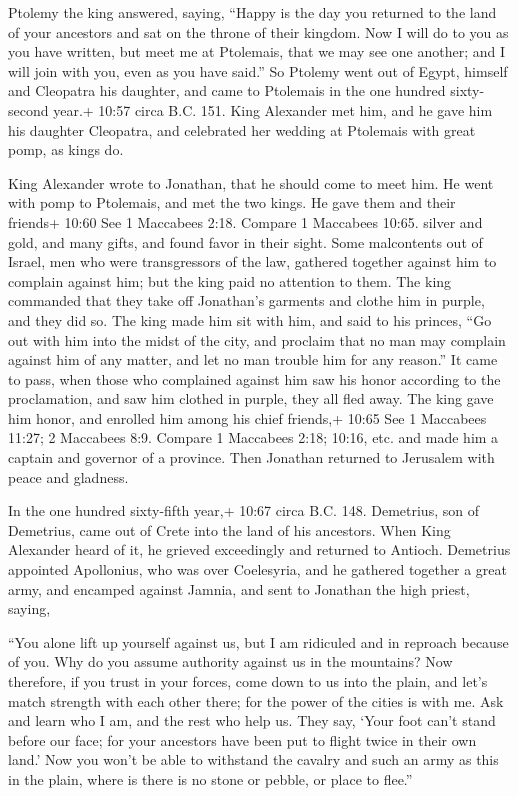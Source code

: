 Ptolemy the king answered, saying, ``Happy is the day you
returned to the land of your ancestors and sat on the throne of their
kingdom.  Now I will do to you as you have written, but
meet me at Ptolemais, that we may see one another; and I will join with
you, even as you have said.''  So Ptolemy went out of
Egypt, himself and Cleopatra his daughter, and came to Ptolemais in the
one hundred sixty-second year.+ 10:57 circa B.C. 151.  King
Alexander met him, and he gave him his daughter Cleopatra, and
celebrated her wedding at Ptolemais with great pomp, as kings do.

 King Alexander wrote to Jonathan, that he should come to
meet him.  He went with pomp to Ptolemais, and met the two
kings. He gave them and their friends+ 10:60 See 1 Maccabees 2:18.
Compare 1 Maccabees 10:65. silver and gold, and many gifts, and found
favor in their sight.  Some malcontents out of Israel, men
who were transgressors of the law, gathered together against him to
complain against him; but the king paid no attention to them.
 The king commanded that they take off Jonathan's garments
and clothe him in purple, and they did so.  The king made
him sit with him, and said to his princes, ``Go out with him into the
midst of the city, and proclaim that no man may complain against him of
any matter, and let no man trouble him for any reason.'' 
It came to pass, when those who complained against him saw his honor
according to the proclamation, and saw him clothed in purple, they all
fled away.  The king gave him honor, and enrolled him among
his chief friends,+ 10:65 See 1 Maccabees 11:27; 2 Maccabees 8:9.
Compare 1 Maccabees 2:18; 10:16, etc. and made him a captain and
governor of a province.  Then Jonathan returned to
Jerusalem with peace and gladness.

 In the one hundred sixty-fifth year,+ 10:67 circa B.C.
148. Demetrius, son of Demetrius, came out of Crete into the land of his
ancestors.  When King Alexander heard of it, he grieved
exceedingly and returned to Antioch.  Demetrius appointed
Apollonius, who was over Coelesyria, and he gathered together a great
army, and encamped against Jamnia, and sent to Jonathan the high priest,
saying,

 ``You alone lift up yourself against us, but I am
ridiculed and in reproach because of you. Why do you assume authority
against us in the mountains?  Now therefore, if you trust
in your forces, come down to us into the plain, and let's match strength
with each other there; for the power of the cities is with me.
 Ask and learn who I am, and the rest who help us. They
say, `Your foot can't stand before our face; for your ancestors have
been put to flight twice in their own land.'  Now you won't
be able to withstand the cavalry and such an army as this in the plain,
where is there is no stone or pebble, or place to flee.''

